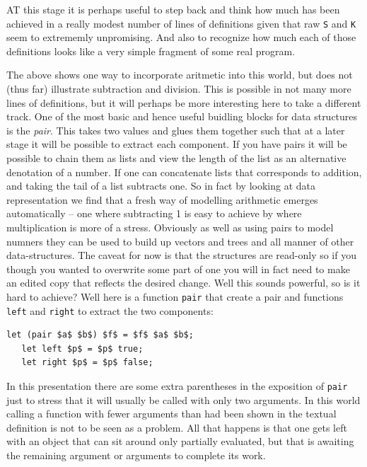AT this stage it is perhaps useful to step back and think how much has
been achieved in a really modest number of lines of definitions given
that raw \verb+S+ and \verb+K+ seem to extrememly unpromising. And
also to recognize how much each of those definitions looks like a very
simple fragment of some real program.

The above shows one way to incorporate aritmetic into this world, but
does not (thus far) illustrate subtraction and division. This is
possible in not many more lines of definitions, but it will perhaps be more
interesting here to take a different track.
One of the most basic and hence
useful buidling blocks for data structures is the {\em pair}. This takes
two values and glues them together such that at a later stage it will be
possible to extract each component. If you have pairs it will be possible
to chain them as lists and view the length of the list as an alternative
denotation of a number. If one can concatenate lists that corresponds
to addition, and taking the tail of a list subtracts one. So in fact by
looking at data representation we find that a fresh way of modelling arithmetic
emerges automatically -- one where subtracting 1 is easy to achieve by
where multiplication is more of a stress. Obviously as well as
using pairs to model numners they can be used to build up vectors and
trees and all manner of other data-structures. The caveat for now is that
the structures are read-only so if you though you wanted to overwrite
some part of one you will in fact need to make an edited copy that
reflects the desired change. Well this sounds powerful, so is it hard to
achieve? Well here is a function \verb+pair+ that create a pair
and functions \verb+left+ and \verb+right+ to extract the two
components:
\begin{lstlisting}[mathescape=true]
   let (pair $a$ $b$) $f$ = $f$ $a$ $b$;
   let left $p$ = $p$ true;
   let right $p$ = $p$ false;
\end{lstlisting}
In this presentation there are some extra parentheses in the
exposition of \verb+pair+ just to stress that it will usually be
called with only two arguments. In this world calling a function with
fewer arguments than had been shown in the textual definition is not
to be seen as a problem. All that happens is that one gets left with an object that
can sit around only partially evaluated, but that is awaiting the remaining argument
or arguments to complete its work.

